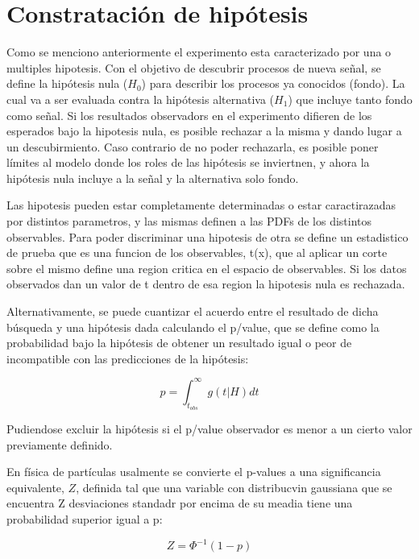 \section{Constratación de hipótesis}

Como se menciono anteriormente el experimento esta caracterizado por una o multiples hipotesis. Con el objetivo de descubrir procesos de nueva señal, se define la hipótesis nula ($H_0$) para describir los procesos ya conocidos (fondo). La cual va a ser evaluada contra la hipótesis alternativa ($H_1$) que incluye tanto fondo como señal. Si los resultados observadors en el experimento difieren de los esperados bajo la hipotesis nula, es posible rechazar a la misma y dando lugar a un descubirmiento. Caso contrario de no poder rechazarla, es posible poner límites al modelo donde los roles de las hipótesis se inviertnen, y ahora la hipótesis nula incluye a la señal y la alternativa solo fondo.

Las hipotesis pueden estar completamente determinadas o estar caractirazadas por distintos parametros, y las mismas definen a las PDFs de los distintos observables. Para poder discriminar una hipotesis de otra se define un estadistico de prueba que es una funcion de los observables, t(x), que al aplicar un corte sobre el mismo define una region critica en el espacio de observables. Si los datos observados dan un valor de t dentro de esa region la hipotesis nula es rechazada.

Alternativamente, se puede cuantizar el acuerdo entre el resultado de dicha búsqueda y una hipótesis dada calculando el p/value, que se define como la probabilidad bajo la hipótesis de obtener un resultado igual o peor de incompatible con las predicciones de la hipótesis:

\begin{equation}
	p = \int_{t_{obs}}^{\infty} g(t|H)dt
\end{equation}

Pudiendose excluir la hipótesis si el p/value observador es menor a un cierto valor previamente definido.

En física de partículas usalmente se convierte el p-values a una significancia equivalente, $Z$, definida tal que una variable con distribucvin gaussiana que se encuentra Z desviaciones standadr por encima de su meadia tiene una probabilidad superior igual a p:

\begin{equation}
	Z=\Phi^{-1}(1-p)
\end{equation}

